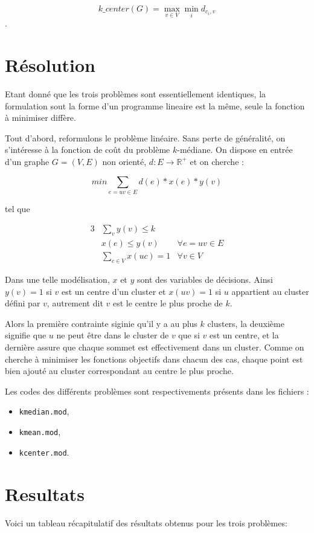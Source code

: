 \documentclass[12pt,a4paper]{article}
\begin{document}
\[ k\_center(G) = \max_{v \in V} \min_i d_{c_i,v} \].

\section*{Résolution}
Etant donné que les trois problèmes sont essentiellement identiques, la formulation sout la forme d'un programme lineaire est la même, seule la fonction à minimiser diffère.

Tout d'abord, reformulons le problème linéaire. Sans perte de généralité, on s'intéresse à la fonction de coût du problème $k$-médiane. On dispose en entrée d'un graphe $G = (V,E)$ non orienté, $d: E \rightarrow \mathbb{R}^+$ et on cherche :

\[ min \sum_{e = uv \in E} d(e) * x(e) * y(v) \]

tel que

\begin{alignat}{3}
& \sum_{v} y(v) \leq k & \\
& x(e) \leq y(v) & \forall e = uv \in E  \\
& \sum_{c \in V} x(uc) = 1 & \forall v \in V
\end{alignat}


Dans une telle modélisation, $x$ et $y$ sont des variables de décisions. Ainsi $y(v) = 1$ si $v$ est un centre d'un cluster et $x(uv) =1$ si $u$ appartient au cluster défini par $v$, autrement dit $v$ est le centre le plus proche de $k$.

Alors la première contrainte siginie qu'il y a au plus $k$ clusters, la deuxième signifie que $u$ ne peut être dans le cluster de $v$ que si $v$ est un centre, et la dernière assure que chaque sommet est effectivement dans un cluster. Comme on cherche à minimiser les fonctions objectifs dans chacun des cas, chaque point est bien ajouté au cluster correspondant au centre le plus proche.

Les codes des différents problèmes sont respectivements présents dans les fichiers :
\begin{itemize}
\item \texttt{kmedian.mod}, 
\item \texttt{kmean.mod},
\item \texttt{kcenter.mod}.
\end{itemize}

\section*{Resultats}
Voici un tableau récapitulatif des résultats obtenus pour les trois problèmes:
\end{document}
